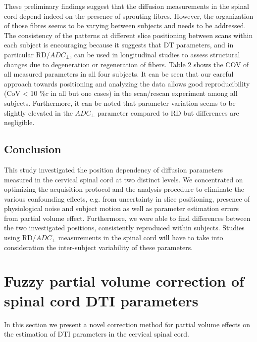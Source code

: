 These preliminary findings suggest that the diffusion measurements in the spinal cord depend indeed on the presence of sprouting fibres. However, the organization of those fibres seems to be varying between subjects and needs to be addressed. The consistency of the patterns at different slice positioning between scans within each subject is encouraging because it suggests that DT parameters, and in particular RD/$ADC_\perp$, can be used in longitudinal studies to assess structural changes due to degeneration or regeneration of fibers. Table 2 shows the COV of all measured parameters in all four subjects. It can be seen that our careful approach towards positioning and analyzing the data allows good reproducibility (CoV < 10 $\%c$ in all but one cases) in the scan/rescan experiment among all subjects. Furthermore, it can be noted that parameter variation seems to be slightly elevated in the $ADC_\perp$ parameter compared to RD but differences are negligible.

\subsection*{Conclusion} This study investigated the position dependency of diffusion parameters measured in the cervical spinal cord at two distinct levels. We concentrated on optimizing the acquisition protocol and the analysis procedure to eliminate the various confounding effects, e.g. from uncertainty in slice positioning, presence of physiological noise and subject motion as well as parameter estimation errors from partial volume effect. Furthermore, we were able to find differences between the two investigated positions, consistently reproduced within subjects. Studies using RD/$ADC_\perp$ measurements in the spinal cord will have to take into consideration the inter-subject variability of these parameters.

\section{Fuzzy partial volume correction of spinal cord DTI parameters} In this section we present a novel correction method for partial volume effects on the estimation of DTI parameters in the cervical spinal cord. 
